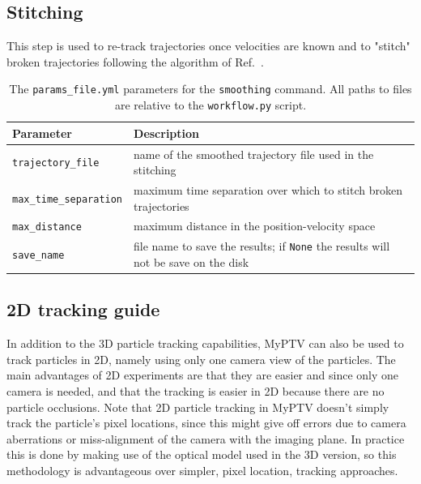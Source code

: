 \documentclass[10pt,a4paper]{article}
\begin{document}
\subsection{Stitching}\label{sec:workflow_stitch}

This step is used to re-track trajectories once velocities are known and to "stitch" broken trajectories following the algorithm of Ref.~\cite{Xu2008}.


\begin{table}[!ht]
	\centering
	\caption{The \texttt{params\_file.yml} parameters for the \texttt{smoothing} command. All paths to files are relative to the \texttt{workflow.py} script.}
	\begin{tabular}{l m{12cm}}
		\hline
		Parameter & Description\\
		\hline
		
		\texttt{trajectory\_file} & name of the smoothed trajectory file used in the stitching \\
		
		\texttt{max\_time\_separation} & maximum time separation over which to stitch broken trajectories \\
		
		\texttt{max\_distance} & maximum distance in the position-velocity space \\
		
		\texttt{save\_name} & file name to save the results; if \texttt{None} the results will not be save on the disk \\
		
		\hline
	\end{tabular}
\end{table}










\subsection{2D tracking guide} \label{sec:2D_tracking}


In addition to the 3D particle tracking capabilities, MyPTV can also be used to track particles in 2D, namely using only one camera view of the particles. The main advantages of 2D experiments are that they are easier and since only one camera is needed, and that the tracking is easier in 2D because there are no particle occlusions. Note that 2D particle tracking in MyPTV doesn't simply track the particle's pixel locations, since this might give off errors due to camera aberrations or miss-alignment of the camera with the imaging plane. In practice this is done by making use of the optical model used in the 3D version, so this methodology is advantageous over simpler, pixel location, tracking approaches. 
\end{document}

